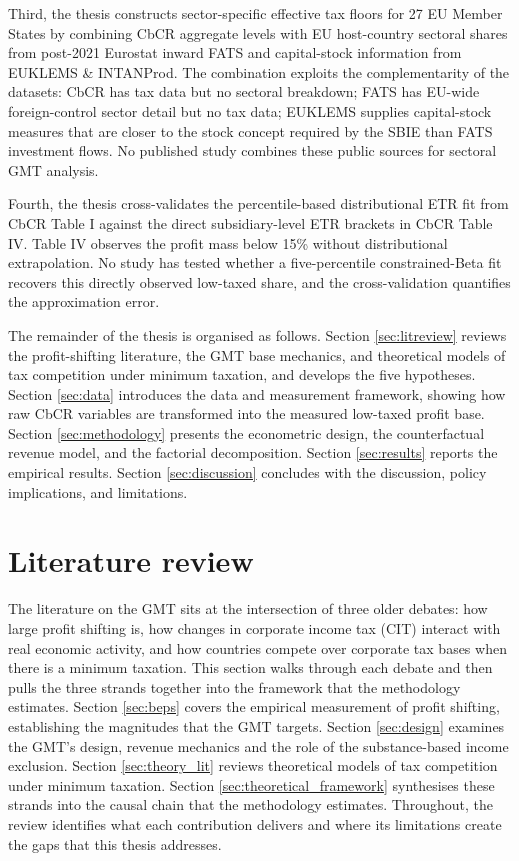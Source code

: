 \documentclass[11pt,a4paper]{article}
\begin{document}
Third, the thesis constructs sector-specific effective tax floors for 27 EU Member States by combining CbCR aggregate levels with EU host-country sectoral shares from post-2021 Eurostat inward FATS and capital-stock information from EUKLEMS \& INTANProd. The combination exploits the complementarity of the datasets: CbCR has tax data but no sectoral breakdown; FATS has EU-wide foreign-control sector detail but no tax data; EUKLEMS supplies capital-stock measures that are closer to the stock concept required by the SBIE than FATS investment flows. No published study combines these public sources for sectoral GMT analysis.

Fourth, the thesis cross-validates the percentile-based distributional ETR fit from CbCR Table I against the direct subsidiary-level ETR brackets in CbCR Table IV\@. Table IV observes the profit mass below 15\% without distributional extrapolation. No study has tested whether a five-percentile constrained-Beta fit recovers this directly observed low-taxed share, and the cross-validation quantifies the approximation error.

The remainder of the thesis is organised as follows. Section \ref{sec:litreview} reviews the profit-shifting literature, the GMT base mechanics, and theoretical models of tax competition under minimum taxation, and develops the five hypotheses. Section \ref{sec:data} introduces the data and measurement framework, showing how raw CbCR variables are transformed into the measured low-taxed profit base. Section \ref{sec:methodology} presents the econometric design, the counterfactual revenue model, and the factorial decomposition. Section \ref{sec:results} reports the empirical results. Section \ref{sec:discussion} concludes with the discussion, policy implications, and limitations.

\newpage
\section{Literature review}\label{sec:literature}\label{sec:litreview}

The literature on the GMT sits at the intersection of three older debates: how large profit shifting is, how changes in corporate income tax (CIT) interact with real economic activity, and how countries compete over corporate tax bases when there is a minimum taxation. This section walks through each debate and then pulls the three strands together into the framework that the methodology estimates. Section \ref{sec:beps} covers the empirical measurement of profit shifting, establishing the magnitudes that the GMT targets. Section \ref{sec:design} examines the GMT's design, revenue mechanics and the role of the substance-based income exclusion. Section \ref{sec:theory_lit} reviews theoretical models of tax competition under minimum taxation. Section \ref{sec:theoretical_framework} synthesises these strands into the causal chain that the methodology estimates. Throughout, the review identifies what each contribution delivers and where its limitations create the gaps that this thesis addresses.
\end{document}
